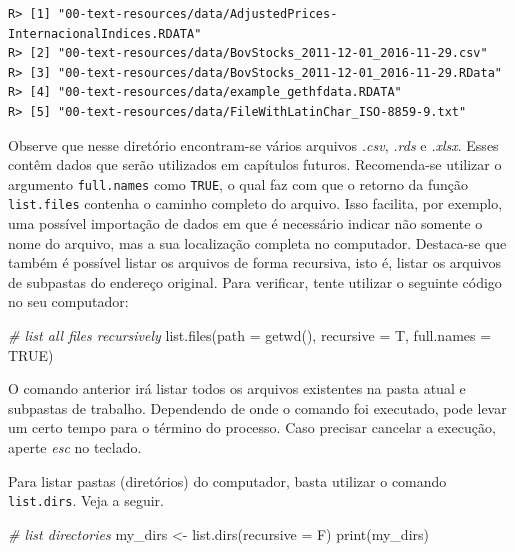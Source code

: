 \documentclass[
  11pt,
]{book}
\newenvironment{Shaded}{\begin{snugshade}}{\end{snugshade}}
\newcommand{\AttributeTok}[1]{\textcolor[rgb]{0.61,0.61,0.61}{#1}}
\newcommand{\CommentTok}[1]{\textcolor[rgb]{0.37,0.37,0.37}{\textit{#1}}}
\newcommand{\ConstantTok}[1]{\textcolor[rgb]{0,0,0}{#1}}
\newcommand{\FunctionTok}[1]{\textcolor[rgb]{0,0,0}{#1}}
\newcommand{\NormalTok}[1]{#1}
\newcommand{\OtherTok}[1]{\textcolor[rgb]{0.37,0.37,0.37}{#1}}
\begin{document}
\begin{verbatim}
R> [1] "00-text-resources/data/AdjustedPrices-InternacionalIndices.RDATA"
R> [2] "00-text-resources/data/BovStocks_2011-12-01_2016-11-29.csv"      
R> [3] "00-text-resources/data/BovStocks_2011-12-01_2016-11-29.RData"    
R> [4] "00-text-resources/data/example_gethfdata.RDATA"                  
R> [5] "00-text-resources/data/FileWithLatinChar_ISO-8859-9.txt"
\end{verbatim}

Observe que nesse diretório encontram-se vários arquivos \emph{.csv}, \emph{.rds} e \emph{.xlsx}. Esses contêm dados que serão utilizados em capítulos futuros. Recomenda-se utilizar o argumento \texttt{full.names} como \texttt{TRUE}, o qual faz com que o retorno da função \texttt{list.files} contenha o caminho completo do arquivo. Isso facilita, por exemplo, uma possível importação de dados em que é necessário indicar não somente o nome do arquivo, mas a sua localização completa no computador. Destaca-se que também é possível listar os arquivos de forma recursiva, isto é, listar os arquivos de subpastas do endereço original. Para verificar, tente utilizar o seguinte código no seu computador:

\begin{Shaded}
\begin{Highlighting}[]
\CommentTok{\# list all files recursively}
\FunctionTok{list.files}\NormalTok{(}\AttributeTok{path =} \FunctionTok{getwd}\NormalTok{(), }\AttributeTok{recursive =}\NormalTok{ T, }\AttributeTok{full.names =} \ConstantTok{TRUE}\NormalTok{)}
\end{Highlighting}
\end{Shaded}

O comando anterior irá listar todos os arquivos existentes na pasta atual e subpastas de trabalho. Dependendo de onde o comando foi executado, pode levar um certo tempo para o término do processo. Caso precisar cancelar a execução, aperte \emph{esc} no teclado.

Para listar pastas (diretórios) do computador, basta utilizar o comando \texttt{list.dirs}. Veja a seguir.

\begin{Shaded}
\begin{Highlighting}[]
\CommentTok{\# list directories}
\NormalTok{my\_dirs }\OtherTok{\textless{}{-}} \FunctionTok{list.dirs}\NormalTok{(}\AttributeTok{recursive =}\NormalTok{ F)}
\FunctionTok{print}\NormalTok{(my\_dirs)}
\end{Highlighting}
\end{Shaded}
\end{document}
